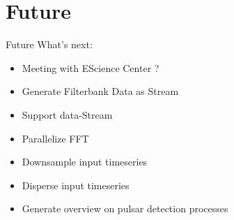 \documentclass{beamer}
\begin{document}
    \section{Future}
    
    \begin{frame}{Future}
        What's next:       
        \begin{itemize}
            \item Meeting with EScience Center ?
            \item Generate Filterbank Data as Stream
            \item Support data-Stream
            \item Parallelize FFT
            \item Downsample input timeseries
            \item Disperse input timeseries
            \item Generate overview on pulsar detection processes
        \end{itemize}
    \end{frame}
    
    
\end{document}
